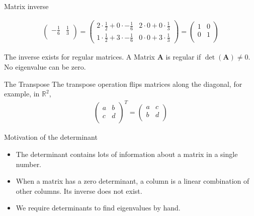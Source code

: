 \documentclass[notes]{beamer}
\begin{document}
\begin{frame}{Matrix inverse}
{\begin{align}
\begin{pmatrix}
          -\frac{1}{6} & \frac{1}{3}\\ 
        \end{pmatrix}
      = 
        \begin{pmatrix}
          2 \cdot \frac{1}{2} + 0 \cdot -\frac{1}{6} & 2 \cdot 0 + 0 \cdot \frac{1}{3}  \\
          1 \cdot \frac{1}{2} + 3 \cdot -\frac{1}{6} & 0 \cdot 0 + 3 \cdot \frac{1}{3} 
        \end{pmatrix}
      =
      \begin{pmatrix}
        1 & 0 \\
        0 & 1 \\ 
      \end{pmatrix}
      \end{align}

      The inverse exists for regular matrices.
      A Matrix $\mathbf{A}$ is regular if $\det(\mathbf{A}) \neq 0$.
      No eigenvalue can be zero. 
      }
    \end{frame}


    \begin{frame}{The Transpose}
      The transpose operation flips matrices along the diagonal, for example, in $\mathbb{R}^2$,
      \begin{align}
        \begin{pmatrix}
          a & b \\
          c & d \\
        \end{pmatrix}^T
        =
        \begin{pmatrix}
          a & c \\
          b & d \\
        \end{pmatrix}
      \end{align}
    \end{frame}

    \begin{frame}{Motivation of the determinant}
      \begin{itemize}
        \item The determinant contains lots of information about a matrix in a single number.
        \item When a matrix has a zero determinant, a column is a linear combination of other
          columns. Its inverse does not exist.
        \item We require determinants to find eigenvalues by hand.
      \end{itemize}
    \end{frame}
\end{document}
